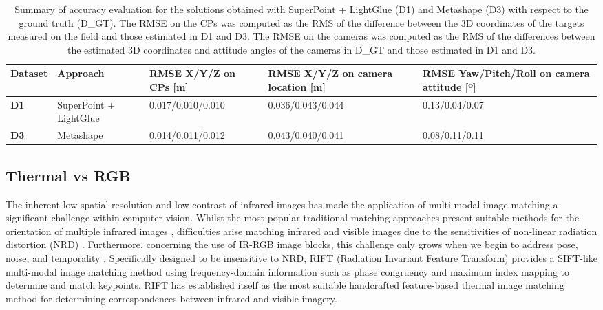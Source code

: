 \begin{table}[ht]
    \centering
    \caption{Summary of accuracy evaluation for the solutions obtained with SuperPoint + LightGlue (D1) and Metashape (D3) with respect to the ground truth (D\_GT). The RMSE on the CPs was computed as the RMS of the difference between the 3D coordinates of the targets measured on the field and those estimated in D1 and D3. The RMSE on the cameras was computed as the RMS of the differences between the estimated 3D coordinates and attitude angles of the cameras in D\_GT and those estimated in D1 and D3.} 
    \label{tab:5:castle_eo_stats}

    \begin{tabular}{p{1 cm} p{2cm} p{3.5cm} p{3.5cm} p{3cm}} 
    \toprule
     \textbf{Dataset} & \textbf{Approach} & \textbf{RMSE X/Y/Z on CPs [m]} & \textbf{RMSE X/Y/Z on camera location [m]} & \textbf{RMSE Yaw/Pitch/Roll on camera attitude [º]} \\ 
     \midrule
    \textbf{D1} & SuperPoint + LightGlue & 0.017/0.010/0.010 & 0.036/0.043/0.044 & 0.13/0.04/0.07 \\
    \textbf{D3} & Metashape & 0.014/0.011/0.012 & 0.043/0.040/0.041 & 0.08/0.11/0.11 \\   
    \bottomrule
    \end{tabular}
\end{table}


\subsection{Thermal vs RGB}

The inherent low spatial resolution and low contrast of infrared images has made the application of multi-modal image matching a significant challenge within computer vision. Whilst the most popular traditional matching approaches present suitable methods for the orientation of multiple infrared images \cite{Firmenich2011_Multispectral, Aguilera2021_multispectral}, difficulties arise matching infrared and visible images due to the sensitivities of non-linear radiation distortion (NRD) \cite{Laguela2013_thermographic, Ham2013_thermal}.
Furthermore, concerning the use of IR-RGB image blocks, this challenge only grows when we begin to address pose, noise, and temporality \cite{Li2020_RIFT, jin_image_2021}. 
Specifically designed to be insensitive to NRD, RIFT (Radiation Invariant Feature Transform) \cite{Li2020_RIFT} provides a SIFT-like multi-modal image matching method using frequency-domain information such as phase congruency and maximum index mapping to determine and match keypoints. 
RIFT has established itself as the most suitable handcrafted feature-based thermal image matching method for determining correspondences between infrared and visible imagery.
 
